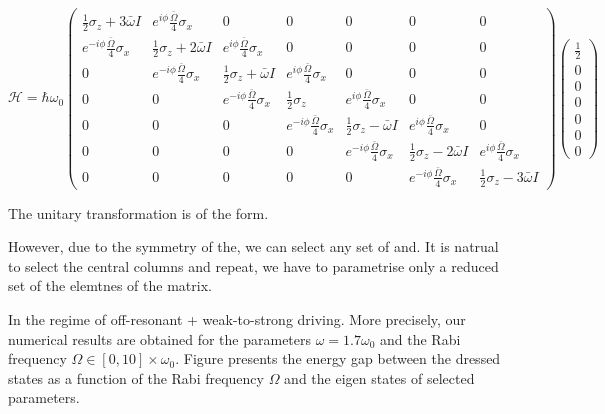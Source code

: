 \documentclass[pra,twocolumn,showkeys,preprintnumbers, amsmath,amssymb, aps,A4paper]{revtex4-1}
\begin{document}
\begin{widetext}
\begin{equation}
\mathcal{H} = \hbar \omega_0 \begin{pmatrix}
 \frac{1}{2} \sigma_z + 3 \bar{\omega} I & e^{i\phi}\frac{\bar{\Omega}}{4} \sigma_x & 0 & 0 & 0 & 0 &0 \\
 e^{-i\phi}\frac{\bar{\Omega} }{4} \sigma_x &  \frac{1}{2} \sigma_z + 2 \bar{\omega}I & e^{i\phi}\frac{\bar{\Omega}}{4} \sigma_x & 0 & 0 & 0 & 0 \\
0& e^{-i\phi}\frac{\bar{\Omega} }{4} \sigma_x &  \frac{1}{2} \sigma_z + \bar{\omega}I & e^{i\phi}\frac{\bar{\Omega}}{4} \sigma_x & 0 & 0 & 0  \\
0 & 0& e^{-i\phi}\frac{\bar{\Omega} }{4} \sigma_x &  \frac{1}{2} \sigma_z& e^{i\phi}\frac{\bar{\Omega}}{4} \sigma_x & 0 & 0 \\
0 & 0 & 0& e^{-i\phi}\frac{\bar{\Omega} }{4} \sigma_x &  \frac{1}{2} \sigma_z -  \bar{\omega}I & e^{i\phi}\frac{\bar{\Omega}}{4} \sigma_x & 0 \\
0 & 0 & 0 & 0& e^{-i\phi}\frac{\bar{\Omega} }{4} \sigma_x &  \frac{1}{2} \sigma_z - 2 \bar{\omega}I & e^{i\phi}\frac{\bar{\Omega}}{4} \sigma_x   \\
0 & 0 & 0 & 0 & 0& e^{-i\phi}\frac{\bar{\Omega} }{4} \sigma_x &  \frac{1}{2} \sigma_z - 3 \bar{\omega}I 
\end{pmatrix}
\begin{pmatrix}
\frac{1}{2}\\
0 \\
0 \\
0 \\
0 \\
0 \\
0  
\end{pmatrix}
\end{equation}
\end{widetext}

The unitary transformation is of the form.


However, due to the symmetry of the, we can select any set of and. It is natrual to select the central columns and repeat, we have to  parametrise only a reduced set of the elemtnes of the matrix.


In the regime of off-resonant + weak-to-strong driving. More precisely, our numerical results are obtained for the parameters $\omega=1.7 \omega_0$ and the Rabi frequency $\Omega \in [ 0,10 ]\times \omega_0$. Figure presents the energy gap between the dressed states as a function of the Rabi frequency $\Omega$  and the eigen states of selected parameters.  
\end{document}
